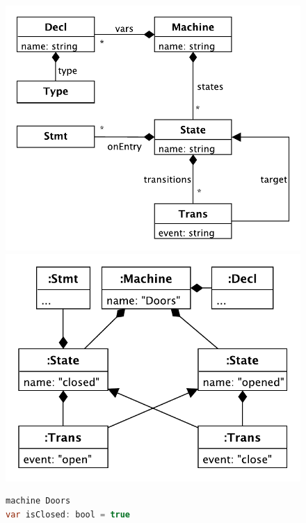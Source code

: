 \documentclass[english,crc]{programming}
\begin{document}
\begin{figure}[t]
\begin{adjustwidth}{-3em}{-3em}
\begin{minipage}{0.4\textwidth}
\includegraphics[width=\textwidth]{figures/metamodel.pdf}
\end{minipage}
\hspace*{2pt}
\vline
\begin{minipage}{0.4\textwidth}
  \includegraphics[width=\textwidth]{figures/doors-ast.pdf}
  \end{minipage}
\hspace*{2pt}
\vline
\begin{minipage}{0.3\textwidth}
  \begin{lstlisting}[language=java,morekeywords={machine,on,state,var},basicstyle=\footnotesize,numbers=none]
machine Doors
var isClosed: bool = true


\end{lstlisting}
\end{minipage}
\end{adjustwidth}
\end{figure}
\end{document}
